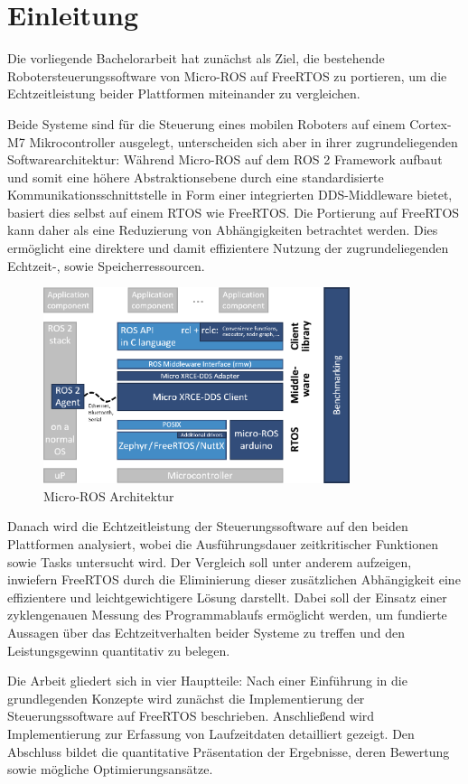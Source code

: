 \section*{Einleitung}

Die vorliegende Bachelorarbeit hat zunächst als Ziel, die bestehende
Robotersteuerungssoftware von Micro-ROS auf FreeRTOS zu portieren, um die
Echtzeitleistung beider Plattformen miteinander zu vergleichen.

Beide Systeme sind für die Steuerung eines mobilen Roboters auf einem Cortex-M7
Mikrocontroller ausgelegt, unterscheiden sich aber in ihrer zugrundeliegenden
Softwarearchitektur: Während Micro-ROS auf dem \ac{ROS 2} Framework aufbaut und
somit eine höhere Abstraktionsebene durch eine standardisierte
Kommunikationsschnittstelle in Form einer integrierten \ac{DDS}-Middleware
bietet, basiert dies selbst auf einem \ac{RTOS} wie FreeRTOS. Die Portierung auf
FreeRTOS kann daher als eine Reduzierung von Abhängigkeiten betrachtet werden.
Dies ermöglicht eine direktere und damit effizientere Nutzung der
zugrundeliegenden Echtzeit-, sowie Speicherressourcen.

\begin{figure}[htb] \centering
    \includegraphics[width=0.8\textwidth]{assets/Micro-ROS_architecture}
    \caption{Micro-ROS Architektur\cite[S. 6]{koubaa2023}}
\end{figure}

Danach wird die Echtzeitleistung der Steuerungssoftware auf den beiden
Plattformen analysiert, wobei die Ausführungsdauer zeitkritischer Funktionen
sowie Tasks untersucht wird. Der Vergleich soll unter anderem aufzeigen,
inwiefern FreeRTOS durch die Eliminierung dieser zusätzlichen Abhängigkeit eine
effizientere und leichtgewichtigere Lösung darstellt. Dabei soll der Einsatz
einer zyklengenauen Messung des Programmablaufs ermöglicht werden, um fundierte
Aussagen über das Echtzeitverhalten beider Systeme zu treffen und den
Leistungsgewinn quantitativ zu belegen.

Die Arbeit gliedert sich in vier Hauptteile: Nach einer Einführung in die
grundlegenden Konzepte wird zunächst die Implementierung der Steuerungssoftware
auf FreeRTOS beschrieben. Anschließend wird Implementierung zur Erfassung von
Laufzeitdaten detailliert gezeigt. Den Abschluss bildet die quantitative
Präsentation der Ergebnisse, deren Bewertung sowie mögliche Optimierungsansätze.
